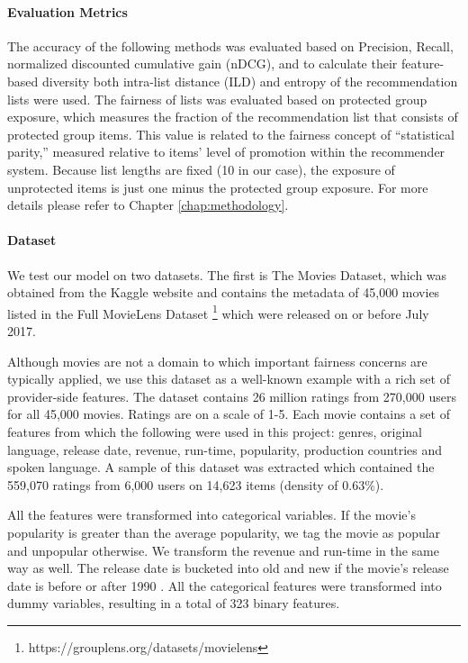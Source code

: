 \noindent\paragraph{\textbf{Evaluation Metrics}}
\newline
\indent The accuracy of the following methods was evaluated based on Precision, Recall, normalized discounted cumulative gain (nDCG), and to calculate their feature-based diversity both intra-list distance (ILD) and entropy of the recommendation lists were used. The fairness of lists was evaluated based on protected group exposure, which measures the fraction of the recommendation list that consists of protected group items. This value is related to the fairness concept of ``statistical parity,'' measured relative to items' level of promotion within the recommender system. Because list lengths are fixed (10 in our case), the exposure of unprotected items is just one minus the protected group exposure. For more details please refer to Chapter \ref{chap:methodology}.

\noindent\paragraph{\textbf{Dataset}}
\newline
\indent We test our model on two datasets. The first is The Movies Dataset, which was obtained from the Kaggle website and contains the metadata of 45,000 movies listed in the Full MovieLens Dataset \footnote{https://grouplens.org/datasets/movielens} which were released on or before July 2017.

Although movies are not a domain to which important fairness concerns are typically applied, we use this dataset as a well-known example with a rich set of provider-side features. The dataset contains 26 million ratings from 270,000 users for all 45,000 movies. Ratings are on a scale of 1-5. Each movie contains a set of features from which the following were used in this project: genres, original language, release date, revenue, run-time, popularity, production countries and spoken language. A sample of this dataset was extracted which contained the 559,070 ratings from 6,000 users on 14,623 items (density of 0.63\%).

All the features were transformed into categorical variables. If the movie's popularity is greater than the average popularity, we tag the movie as popular and unpopular otherwise. We transform the revenue and run-time in the same way as well. The release date is bucketed into old and new if the movie's release date is before or after 1990 \cite{kamishima2016model}. All the categorical features were transformed into dummy variables, resulting in a total of 323 binary features.

